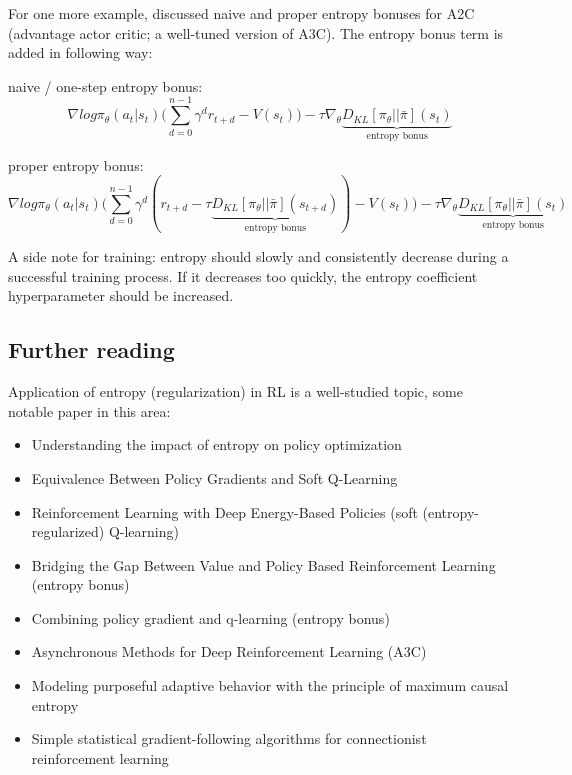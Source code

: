 \documentclass[lang=en,mode=normal,device=normal,color=blue,12pt]{elegantnote}
\DeclareMathOperator*{\1}{\mathbbm{1}}
\begin{document}
\begin{appendices}
For one more example, \cite{schulman2018equivalence} discussed naive and proper entropy bonuses for A2C (advantage actor critic; a well-tuned version of A3C). The entropy bonus term is added in following way:

naive / one-step entropy bonus:
\[
\nabla log \pi_\theta (a_t | s_t) \bigg( \sum_{d=0}^{n-1} \gamma^d r_{t+d} - V(s_t) \bigg) - \tau \nabla_\theta \underbrace{ D_{KL} [\pi_\theta || \bar{\pi} ] (s_t)}_\text{entropy bonus}
\]

proper entropy bonus:
\[
\nabla log \pi_\theta (a_t | s_t) \bigg( \sum_{d=0}^{n-1} \gamma^d (r_{t+d} - \tau \underbrace{ D_{KL}[\pi_\theta || \bar{\pi}](s_{t+d})}_\text{entropy bonus} ) - V(s_t) \bigg) - \tau \nabla_\theta \underbrace{ D_{KL} [\pi_\theta || \bar{\pi} ] (s_t) }_\text{entropy bonus}
\]

A side note for training: entropy should slowly and consistently decrease during a successful training process. If it decreases too quickly, the entropy coefficient hyperparameter should be increased.


\subsection{Further reading}

Application of entropy (regularization) in RL is a well-studied topic, some notable paper in this area:

\begin{itemize}
\item \cite{ahmed2019understanding} Understanding the impact of entropy on policy optimization
\item \cite{schulman2018equivalence} Equivalence Between Policy Gradients and Soft Q-Learning
\item \cite{haarnoja2017reinforcement} Reinforcement Learning with Deep Energy-Based Policies (soft (entropy-regularized) Q-learning)
\item \cite{nachum2017bridging} Bridging the Gap Between Value and Policy Based Reinforcement Learning (entropy bonus)
\item \cite{odonoghue2017combining} Combining policy gradient and q-learning (entropy bonus)
\item \cite{mnih2016asynchronous} Asynchronous Methods for Deep Reinforcement Learning (A3C)
\item \cite{brianEntropy2010} Modeling purposeful adaptive behavior with the principle of maximum causal entropy
\item \cite{Williams1992SimpleSG} Simple statistical gradient-following algorithms for connectionist reinforcement learning
\end{itemize}


\end{appendices}
\end{document}
